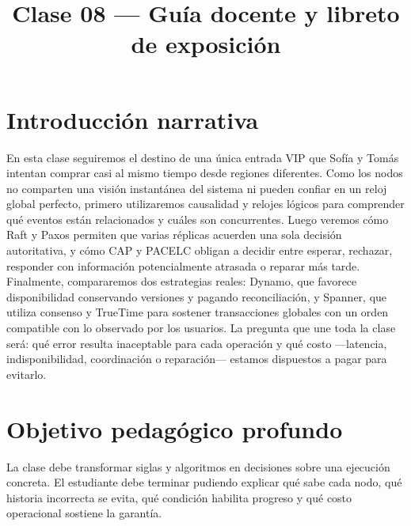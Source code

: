 \documentclass[variant=docente,cover=institutional,mode=screen]{ua-engineering-v6-article}
\title{Clase 08 --- Guía docente y libreto de exposición}
\author{\UAProfessor}
\date{\UADate}
\begin{document}
\maketitle

\section{Introducción narrativa}
En esta clase seguiremos el destino de una única entrada VIP que Sofía y Tomás intentan comprar casi al mismo tiempo desde regiones diferentes. Como los nodos no comparten una visión instantánea del sistema ni pueden confiar en un reloj global perfecto, primero utilizaremos causalidad y relojes lógicos para comprender qué eventos están relacionados y cuáles son concurrentes. Luego veremos cómo Raft y Paxos permiten que varias réplicas acuerden una sola decisión autoritativa, y cómo CAP y PACELC obligan a decidir entre esperar, rechazar, responder con información potencialmente atrasada o reparar más tarde. Finalmente, compararemos dos estrategias reales: Dynamo, que favorece disponibilidad conservando versiones y pagando reconciliación, y Spanner, que utiliza consenso y TrueTime para sostener transacciones globales con un orden compatible con lo observado por los usuarios. La pregunta que une toda la clase será: qué error resulta inaceptable para cada operación y qué costo ---latencia, indisponibilidad, coordinación o reparación--- estamos dispuestos a pagar para evitarlo.

\section{Objetivo pedagógico profundo}
La clase debe transformar siglas y algoritmos en decisiones sobre una ejecución concreta. El estudiante debe terminar pudiendo explicar qué sabe cada nodo, qué historia incorrecta se evita, qué condición habilita progreso y qué costo operacional sostiene la garantía.
\end{document}
